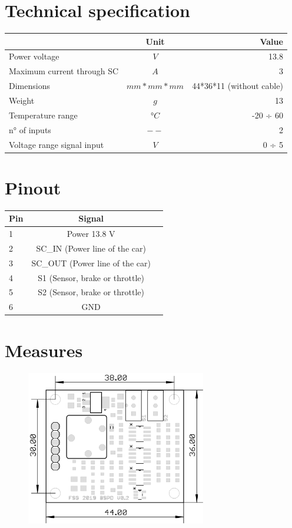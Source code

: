 \documentclass[a4paper,12pt,oneside,pdflatex,italian,final,twocolumn]{article}
\begin{document}
\section{Technical specification}
\centering
\begin{tabular}{lcr}
\toprule
 & Unit & Value \\
\midrule
Power voltage & $V$ & 13.8 \\
Maximum current  through SC & $A$ & 3 \\
Dimensions & $mm*mm*mm$ & 44*36*11 (without cable) \\
Weight & $g$ & 13 \\
Temperature range & $°C$ & -20 ÷ 60\\
n° of inputs & $--$ & 2 \\
Voltage range signal input & $V$ & 0 ÷ 5 \\
\bottomrule
\end{tabular}

\raggedright

\section{Pinout}

\centering
\begin{tabular}{lcr}
\toprule
  Pin & Signal \\
\midrule
1 & Power 13.8 V  \\
2 & SC\_IN (Power line of the car)  \\
3 & SC\_OUT (Power line of the car)   \\
4 & S1 (Sensor, brake or throttle)  \\
5 & S2 (Sensor, brake or throttle) \\
6 & GND  \\
\bottomrule
\end{tabular}



\raggedright
\section{Measures}
\centering
\begin{figure} [h]
\centering
\includegraphics[width=0.7\textwidth,]{measures.png}

\end{figure}
\end{document}
